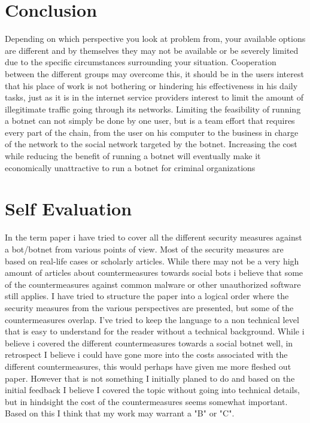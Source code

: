 \section{Conclusion}
Depending on which perspective you look at problem from, your available options are different and by themselves they may not be available or be severely limited due to the specific circumstances surrounding your situation. Cooperation between the different groups may overcome this, it should be in the users interest that his place of work is not bothering or hindering his effectiveness in his daily tasks, just as it is in the internet service providers interest to limit the amount of illegitimate traffic going through its networks. Limiting the feasibility of running a botnet can not simply be done by one user, but is a team effort that requires every part of the chain, from the user on his computer to the business in charge of the network to the social network targeted by the botnet.
Increasing the cost while reducing the benefit of running a botnet will eventually make it economically unattractive to run a botnet for criminal organizations
\section*{Self Evaluation}
In the term paper i have tried to cover all the different security measures against a bot/botnet from various points of view. Most of the security measures are based on real-life cases or scholarly articles.
While there may not be a very high amount of articles about countermeasures towards social bots i believe that some of the countermeasures against common malware or other unauthorized software still applies.
I have tried to structure the paper into a logical order where the security measures from the various perspectives are presented, but some of the countermeasures overlap.
I've tried to keep the language to a non technical level that is easy to understand for the reader without a technical background. 
While i believe i covered the different countermeasures towards a social botnet well, in retrospect I believe i could have gone more into the costs associated with the different countermeasures, this would perhaps have given me more fleshed out paper.
However that is not something I initially planed to do and based on the initial feedback I believe I covered the topic without going into technical details, but in hindsight the cost of the countermeasures seems somewhat important.
Based on this I think that my work may warrant a "B" or "C".
